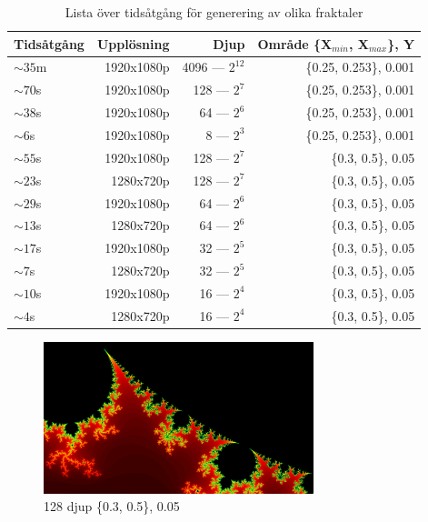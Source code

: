 \documentclass[a4paper, 11pt]{article}
\begin{document}
\begin{table}[h]
\centering
\begin{tabular}{|l|r|r|r|}  
\hline
Tidsåtgång & Upplösning & Djup & Område \{X$_{min}$, X$_{max}$\}, Y\\
\hline
$\sim35$m & 1920x1080p & 4096 --- $2^{12}$ & \{0.25, 0.253\}, 0.001\\
\hline
$\sim70$s & 1920x1080p & 128 --- $2^7$ & \{0.25, 0.253\}, 0.001\\
\hline
$\sim38$s & 1920x1080p & 64 --- $2^6$ & \{0.25, 0.253\}, 0.001\\
\hline
$\sim6$s & 1920x1080p & 8 --- $2^3$ & \{0.25, 0.253\}, 0.001\\
\hline
$\sim55$s & 1920x1080p & 128 --- $2^7$ & \{0.3, 0.5\}, 0.05\\
\hline
$\sim23$s & 1280x720p & 128 --- $2^7$ & \{0.3, 0.5\}, 0.05\\
\hline
$\sim29$s & 1920x1080p & 64 --- $2^6$ & \{0.3, 0.5\}, 0.05\\
\hline
$\sim13$s & 1280x720p & 64 --- $2^6$ & \{0.3, 0.5\}, 0.05\\
\hline
$\sim17$s & 1920x1080p & 32 --- $2^5$ & \{0.3, 0.5\}, 0.05\\
\hline
$\sim7$s & 1280x720p & 32 --- $2^5$ & \{0.3, 0.5\}, 0.05\\
\hline
$\sim10$s & 1920x1080p & 16 --- $2^4$ & \{0.3, 0.5\}, 0.05\\
\hline
$\sim4$s & 1280x720p & 16 --- $2^4$ & \{0.3, 0.5\}, 0.05\\
\hline
\end{tabular}
\caption{Lista över tidsåtgång för generering av olika fraktaler}
\label{tab:timer}
\end{table}

\begin{figure}[h!]
  \centering
    \includegraphics[width=0.7\textwidth]{1080p128zoneb}
  \caption{128 djup \{0.3, 0.5\}, 0.05}
  \label{fig:B128d}
\end{figure}
\end{document}
